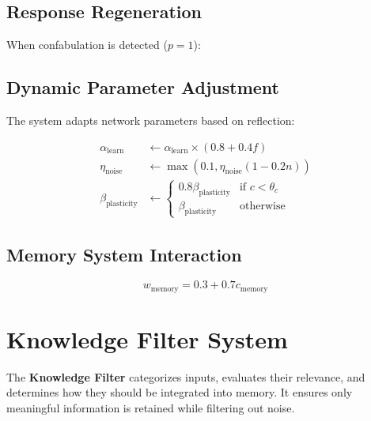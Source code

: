 \documentclass{article}
\begin{document}
\subsection{Response Regeneration}

When confabulation is detected ($p=1$):

\subsection{Dynamic Parameter Adjustment}

The system adapts network parameters based on reflection:

\begin{align}
\alpha_{\text{learn}} &\gets \alpha_{\text{learn}} \times (0.8 + 0.4f) \\
\eta_{\text{noise}} &\gets \max(0.1, \eta_{\text{noise}}(1-0.2n)) \\
\beta_{\text{plasticity}} &\gets
\begin{cases}
0.8\beta_{\text{plasticity}} & \text{if } c < \theta_c \\
\beta_{\text{plasticity}} & \text{otherwise}
\end{cases}
\end{align}

\subsection{Memory System Interaction}
\begin{equation}
w_{\text{memory}} = 0.3 + 0.7c_{\text{memory}}
\end{equation}

\section{Knowledge Filter System}
The \textbf{Knowledge Filter} categorizes inputs, evaluates their relevance, and determines how they should be integrated into memory. It ensures only meaningful information is retained while filtering out noise.
\end{document}
